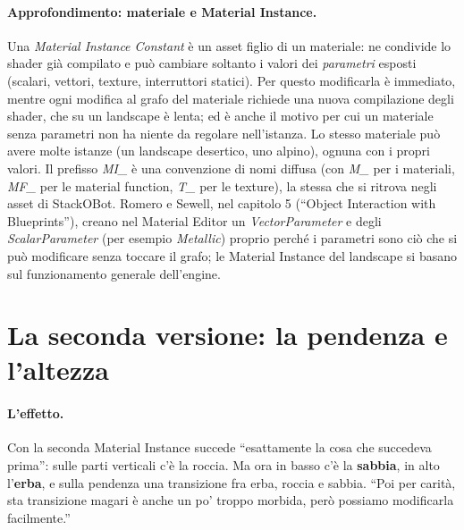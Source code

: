 \paragraph{Approfondimento: materiale e Material Instance.} Una \emph{Material Instance
Constant} è un asset figlio di un materiale: ne condivide lo shader già compilato e può
cambiare soltanto i valori dei \emph{parametri} esposti (scalari, vettori, texture,
interruttori statici). Per questo modificarla è immediato, mentre ogni modifica al grafo del
materiale richiede una nuova compilazione degli shader, che su un landscape è lenta; ed è
anche il motivo per cui un materiale senza parametri non ha niente da regolare
nell'istanza. Lo stesso materiale può avere molte istanze (un landscape desertico, uno
alpino), ognuna con i propri valori. Il prefisso \emph{MI\_} è una convenzione di nomi
diffusa (con \emph{M\_} per i materiali, \emph{MF\_} per le material function, \emph{T\_}
per le texture), la stessa che si ritrova negli asset di StackOBot. Romero e Sewell, nel
capitolo 5 (``Object Interaction with Blueprints''), creano nel Material Editor un
\emph{VectorParameter} e degli \emph{ScalarParameter} (per esempio \emph{Metallic}) proprio
perché i parametri sono ciò che si può modificare senza toccare il grafo; le Material
Instance del landscape si basano sul funzionamento generale dell'engine.

\section{La seconda versione: la pendenza e l'altezza}
\label{ue15:sec:altezza}

\paragraph{L'effetto.} Con la seconda Material Instance succede ``esattamente la cosa che
succedeva prima'': sulle parti verticali c'è la roccia. Ma ora in basso c'è la
\textbf{sabbia}, in alto l'\textbf{erba}, e sulla pendenza una transizione fra erba, roccia
e sabbia. ``Poi per carità, sta transizione magari è anche un po' troppo morbida, però
possiamo modificarla facilmente.''

